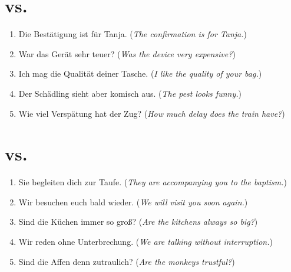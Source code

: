 \section*{\textipa{[e]} vs.\ \textipa{[E]}}
\begin{enumerate}[resume]
	\item Die Bestätigung ist für Tanja. (\textit{The confirmation is for Tanja.})
	\item War das Gerät sehr teuer? (\textit{Was the device very expensive?})
	\item Ich mag die Qualität deiner Tasche. (\textit{I like the quality of your bag.})
	\item Der Schädling sieht aber komisch aus. (\textit{The pest looks funny.})
	\item Wie viel Verspätung hat der Zug? (\textit{How much delay does the train have?})
\end{enumerate}

\section*{\textipa{[@n]} vs.\ \textipa{[\s{n}]}}
\begin{enumerate}[resume]
	\item Sie begleiten dich zur Taufe. (\textit{They are accompanying you to the baptism.})
	\item Wir besuchen euch bald wieder. (\textit{We will visit you soon again.})
	\item Sind die Küchen immer so groß? (\textit{Are the kitchens always so big?})
	\item Wir reden ohne Unterbrechung. (\textit{We are talking without interruption.})
	\item Sind die Affen denn zutraulich? (\textit{Are the monkeys trustful?})
\end{enumerate}
